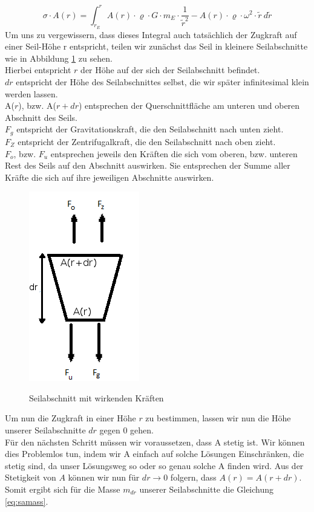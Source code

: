 \documentclass[a4paper, 10pt]{report}
\begin{document}
\begin{equation}
\sigma \cdot A(r) = \int_{r_E}^{r} A(r) \cdot \varrho \cdot G \cdot m_E \cdot \frac{1}{\tilde{r}^2} - A(r) \cdot \varrho \cdot \omega^2 \cdot \tilde{r}\ d\tilde{r}
\label{eq:taperint}
\end{equation}
Um uns zu vergewissern, dass dieses Integral auch tatsächlich der Zugkraft auf einer Seil-Höhe r entspricht, teilen wir zunächst das Seil in kleinere Seilabschnitte wie in Abbildung \ref{fig:differential} zu sehen.\\
Hierbei entspricht $r$ der Höhe auf der sich der Seilabschnitt befindet.\\
$dr$ entspricht der Höhe des Seilabschnittes selbst, die wir später infinitesimal klein werden lassen.\\
A($r$), bzw. A($r+dr$) entsprechen der Querschnittfläche am unteren und oberen Abschnitt des Seils.\\
$F_g$ entspricht der Gravitationskraft, die den Seilabschnitt nach unten zieht.\\
$F_Z$ entspricht der Zentrifugalkraft, die den Seilabschnitt nach oben zieht.\\
$F_o$, bzw. $F_u$ entsprechen jeweils den Kräften die sich vom oberen, bzw. unteren Rest des Seils auf den Abschnitt auswirken. Sie entsprechen der Summe aller Kräfte die sich auf ihre jeweiligen Abschnitte auswirken.
\begin{figure}[!htb]
	\centering
	\includegraphics{differential}
	\label{fig:differential}
	\caption{Seilabschnitt mit wirkenden Kräften}
\end{figure}
Um nun die Zugkraft in einer Höhe $r$ zu bestimmen, lassen wir nun die Höhe unserer Seilabschnitte $dr$ gegen 0 gehen.\\
Für den nächsten Schritt müssen wir voraussetzen, dass A stetig ist. Wir können dies Problemlos tun, indem wir A einfach auf solche Lösungen Einschränken, die stetig sind, da unser Lösungsweg so oder so genau solche A finden wird. Aus der Stetigkeit von $A$ können wir nun für $dr \rightarrow 0$ folgern, dass $A(r)=A(r+dr)$. Somit ergibt sich für die Masse $m_{dr}$ unserer Seilabschnitte die Gleichung \ref{eq:samass}.
\end{document}
